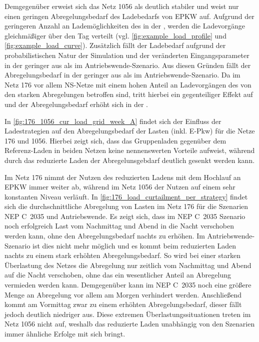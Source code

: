 Demgegenüber erweist sich das Netz \num{1056} als deutlich stabiler und weist nur einen geringen Abregelungsbedarf des Ladebedarfs von \gls{EPKW} auf.
Aufgrund der geringeren Anzahl an Lademöglichkeiten des \UC \Firmeparkplatz in der \SzeFirmenparkplatzdot, werden die Ladevorgänge gleichmäßiger über den Tag verteilt (vgl. \autoref{fig:example_load_profile} und \autoref{fig:example_load_curve}).
Zusätzlich fällt der Ladebedarf aufgrund der probabilistischen Natur der Simulation und der veränderten Eingangsparameter in der \SzeFirmenparkplatz geringer aus als im Antriebswende-Szenario.
Aus diesen Gründen fällt der Abregelungsbedarf in der \SzeFirmenparkplatz geringer aus als im Antriebswende-Szenario.
Da im Netz \num{176} vor allem \gls{NS}-Netze mit einem hohen Anteil an Ladevorgängen des \UCs \zH von den starken Abregelungen betroffen sind, tritt hierbei ein gegenteiliger Effekt auf und der Abregelungsbedarf erhöht sich in der \SzeFirmenparkplatzdot.





In \autoref{fig:176_1056_cur_load_grid_week_A} findet sich der Einfluss der Ladestrategien auf den Abregelungsbedarf der Lasten (inkl. E-Pkw) für die Netze \num{176} und \num{1056}.
Hierbei zeigt sich, dass das Gruppenladen gegenüber dem Referenz-Laden in beiden Netzen keine nennenswerten Vorteile aufweist, während durch das reduzierte Laden der Abregelunsgebdarf deutlich gesenkt werden kann.



Im Netz \num{176} nimmt der Nutzen des reduzierten Ladens mit dem Hochlauf an \gls{EPKW} immer weiter ab, während im Netz \num{1056} der Nutzen auf einem sehr konstanten Niveau verläuft.
In \autoref{fig:176_load_curtailment_per_strategy} findet sich die durchschnittliche Abregelung von Lasten im Netz \num{176} für die Szenarien NEP C~\num{2035} und Antriebswende.
Es zeigt sich, dass im NEP C~\num{2035} Szenario noch erfolgreich Last vom Nachmittag und Abend in die Nacht verschoben werden kann, ohne den Abregelungsbedarf nachts zu erhöhen.
Im Antriebswende-Szenario ist dies nicht mehr möglich und es kommt beim reduzierten Laden nachts zu einem stark erhöhten Abregelungsbedarf.
So wird bei einer starken Überlastung des Netzes die Abregelung nur zeitlich vom Nachmittag und Abend auf die Nacht verschoben, ohne das ein wesentlicher Anteil an Abregelung vermieden werden kann.
Demgegenüber kann im NEP C~\num{2035} noch eine größere Menge an Abregelung vor allem am Morgen verhindert werden.
Anschließend kommt am Vormittag zwar zu einem erhöhten Abregelungsbedarf, dieser fällt jedoch deutlich niedriger aus.
Diese extremen Überlastungssituationen treten im Netz \num{1056} nicht auf, weshalb das reduzierte Laden unabhängig von den Szenarien immer ähnliche Erfolge mit sich bringt.\medskip

